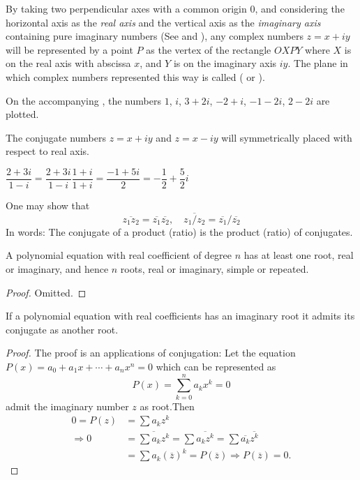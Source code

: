\documentclass[11pt]{amsbook}
\begin{document}
By taking two perpendicular axes with a common origin $0$, 
and considering 
the horizontal axis as the \textit{real axis}
and
the vertical axis as the \textit{imaginary axis}
containing pure imaginary numbers
(See 
 and 
),
any complex numbers $z = x + iy$ will be represented 
by a point $P$ as the vertex of the rectangle $OXPY$ 
where 
$X$ is on the real axis with abscissa $x$, and 
$Y$ is on the imaginary axis $iy$. 
The plane in which complex numbers represented this way is called  
( or
).

On the accompanying , 
the numbers 
$1$, 
$i$, 
$3 + 2i$, 
$-2 + i$, 
$-1 - 2i$, 
$2 - 2i$ are plotted.

The conjugate numbers $z = x + iy$ and $z = x - iy$ will 
symmetrically placed with respect to real axis.

\begin{exmp}
	$\dfrac{2 + 3i}{1 - i} 
	= \dfrac{2 + 3i}{1 - i} \dfrac{1 + i}{1 + i}
	= \dfrac{-1 + 5i}{2}
	= - \dfrac{1}{2} + \dfrac{5}{2} i$
\end{exmp}

One may show that 
\[
	\overline{z_{1} z_{2}} 
	= \overline{z_{1}} \overline{z_{2}},
	\quad 
	\overline{z_{1} / z_{2}} 
	= \overline{z_{1}} / \overline{z_{2}}
\]
In words: 
The conjugate of a product (ratio) is 
the product (ratio) of conjugates.

\begin{thm}
	A polynomial equation with real coefficient of degree $n$ 
	has at least one root, real or imaginary, 
	and hence $n$ roots, real or imaginary, simple or repeated.

	\begin{proof}
		Omitted.
	\end{proof}
\end{thm}


\begin{cor}
	If a polynomial equation with real coefficients 
	has an imaginary root 
	it admits its conjugate as another root.
	\begin{proof}
		The proof is an applications of conjugation:
		Let the equation 
		$P(x) = a_{0} + a_{1}x + \cdots + a_{n}x^{n} = 0$ 
		which can be represented as 
		\[
			P(x) = \sum_{k = 0}^{n} a_{k} x^{k} = 0 
		\]
		admit the imaginary number $ z $ as root.Then
		\begin{align*}
			0 = P(z) 
			&= \sum a_{k} z^{k}\\
			\Longrightarrow  0 
			&= \overline{\sum a_{k}z^{k}} 
			= \sum \overline{a_{k} z^{k}} 
			= \sum \overline{a_{k}} \overline{z^{k}}\\ 
			&= \sum a_{k} (\overline{z})^{k}
			= P(\overline{z}) 
			\Longrightarrow P(\overline{z}) = 0.
		\end{align*}
	\end{proof}
\end{cor}
\end{document}

